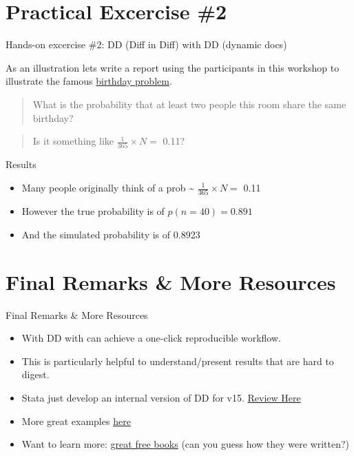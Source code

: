 \section{Practical Excercise \#2}\label{practical-excercise-2}

\begin{frame}{Hands-on excercise \#2: DD (Diff in Diff) with DD (dynamic
docs)}

As an illustration lets write a report using the participants in this
workshop to illustrate the famous
\href{https://en.wikipedia.org/wiki/Birthday_problem}{birthday problem}.

\begin{quote}
What is the probability that at least two people this room share the
same birthday?
\end{quote}

\begin{quote}
Is it something like \(\frac{1}{365} \times N =\) 0.11?
\end{quote}

\end{frame}

\begin{frame}{Results}

\begin{itemize}
\tightlist
\item
  Many people originally think of a prob \textasciitilde{}
  \(\frac{1}{365} \times N =\) 0.11
\item
  However the true probability is of \(p(n= 40) = 0.891\)
\item
  And the simulated probability is of 0.8923
\end{itemize}

\end{frame}

\section{Final Remarks \& More
Resources}\label{final-remarks-more-resources}

\begin{frame}{Final Remarks \& More Resources}

\begin{itemize}
\tightlist
\item
  With DD with can achieve a one-click reproducible workflow.
\item
  This is particularly helpful to understand/present results that are
  hard to digest.
\item
  Stata just develop an internal version of DD for v15.
  \href{https://www.bitss.org/2017/09/05/review-of-statas-dyndoc/}{Review
  Here}
\item
  More great examples
  \href{https://github.com/BITSS/Annual2017/tree/master/3-Rmarkdown}{here}
\item
  Want to learn more: \href{https://bookdown.org/}{great free books}
  (can you guess how they were written?)
\end{itemize}

\end{frame}
